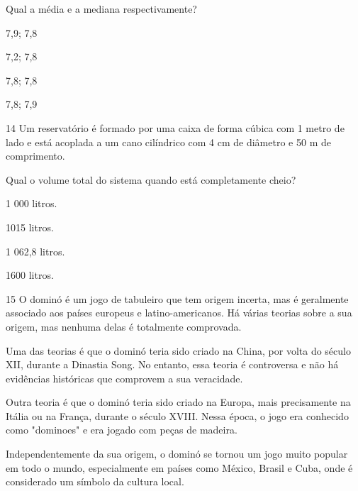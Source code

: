 Qual a média e a mediana respectivamente?

\begin{escolha}
\item 7,9; 7,8

\item 7,2; 7,8

\item 7,8; 7,8

\item 7,8; 7,9
\end{escolha}


\num{14} Um reservatório é formado por uma caixa de forma cúbica com 1 metro
de lado e está acoplada a um cano cilíndrico com 4 cm de diâmetro e 50 m
de comprimento.

Qual o volume total do sistema quando está completamente cheio?

\begin{escolha}
\item 1 000 litros.

\item 1015 litros.

\item 1 062,8 litros.

\item 1600 litros.
\end{escolha}


\num{15} O dominó é um jogo de tabuleiro que tem origem incerta, mas é
geralmente associado aos países europeus e latino-americanos. Há várias
teorias sobre a sua origem, mas nenhuma delas é totalmente comprovada.

Uma das teorias é que o dominó teria sido criado na China, por volta do
século XII, durante a Dinastia Song. No entanto, essa teoria é
controversa e não há evidências históricas que comprovem a sua
veracidade.

Outra teoria é que o dominó teria sido criado na Europa, mais
precisamente na Itália ou na França, durante o século XVIII. Nessa
época, o jogo era conhecido como "dominoes" e era jogado com peças de
madeira.

\pagebreak
Independentemente da sua origem, o dominó se tornou um jogo muito
popular em todo o mundo, especialmente em países como México, Brasil e
Cuba, onde é considerado um símbolo da cultura local.

